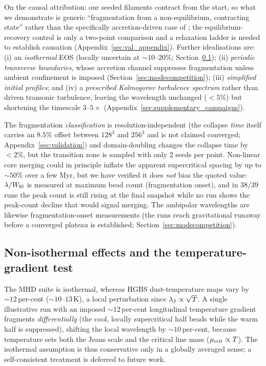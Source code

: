 \documentclass[usenatbib,twoside,twocolumn]{mnras}
\begin{document}
On the causal attribution: our seeded filaments contract from the start, so what we demonstrate is generic ``fragmentation from a non-equilibrium, contracting state'' rather than the specifically accretion-driven case of \citet{Clarke2016,Clarke2017}; the equilibrium-recovery control is only a two-point comparison and a relaxation ladder is needed to establish causation (Appendix~\ref{sec:val_appendix}). Further idealisations are: (i) an \emph{isothermal} EOS (locally uncertain at $\sim10$--$20\%$; Section~\ref{sec:mt_variation}); (ii) \emph{periodic transverse boundaries}, whose accretion channel suppresses fragmentation unless ambient confinement is imposed (Section~\ref{sec:modecompetition}); (iii) \emph{simplified initial profiles}; and (iv) a \emph{prescribed Kolmogorov turbulence spectrum} rather than driven transonic turbulence, leaving the wavelength unchanged ($<5\%$) but shortening the timescale $3$--$5\times$ (Appendix~\ref{sec:supplementary_campaigns}).

The fragmentation \emph{classification} is resolution-independent (the collapse \emph{time} itself carries an $8.5\%$ offset between $128^3$ and $256^3$ and is not claimed converged; Appendix~\ref{sec:validation}) and domain-doubling changes the collapse time by $<2\%$, but the transition zone is sampled with only 2 seeds per point. Non-linear core merging could in principle inflate the apparent supercritical spacing by up to $\sim50\%$ over a few Myr, but we have verified it does \emph{not} bias the quoted value: $\lambda/W_{\rm fil}$ is measured at maximum bead count (fragmentation onset), and in $38/39$ runs the peak count is still rising at the final snapshot while no run shows the peak-count decline that would signal merging. The ambipolar wavelengths are likewise fragmentation-onset measurements (the runs reach gravitational runaway before a converged plateau is established; Section~\ref{sec:modecompetition}).

\subsection{Non-isothermal effects and the temperature-gradient test}
\label{sec:mt_variation}

The MHD suite is isothermal, whereas HGBS dust-temperature maps vary by $\sim12$\,per-cent ($\sim10$--$13$\,K), a local perturbation since $\lambda_{\rm J}\propto\sqrt{T}$. A single illustrative run with an imposed $\sim12$\,per-cent longitudinal temperature gradient fragments \emph{differentially} (the cool, locally supercritical half beads while the warm half is suppressed), shifting the local wavelength by $\sim10$\,per-cent, because temperature sets both the Jeans scale and the critical line mass ($\mu_{\rm crit}\propto T$). The isothermal assumption is thus conservative only in a globally averaged sense; a self-consistent treatment is deferred to future work.
\end{document}

